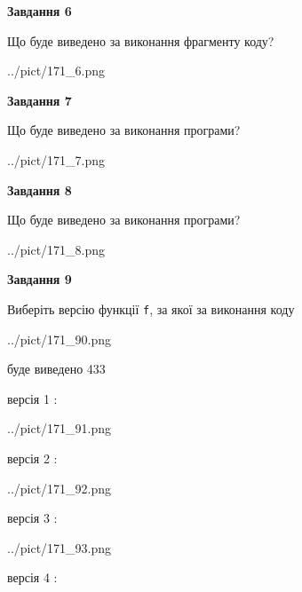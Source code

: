 \documentclass[12pt, ukrainian]{article}
\def\code#1{\Verb!#1!}
\begin{document}
{\begin {large}
{\begin {center}\textbf{Завдання 6}\end {center}}

Що буде виведено за виконання фрагменту коду?\par
\begin{center}
	{../pict/171_6.png}
\end{center}
\newpage

{\begin {center}\textbf{Завдання 7}\end {center}}

Що буде виведено за виконання програми?\par
\begin{center}
	{../pict/171_7.png}
\end{center}
\newpage

{\begin {center}\textbf{Завдання 8}\end {center}}

Що буде виведено за виконання програми?\par
\begin{center}
	{../pict/171_8.png}
\end{center}
\newpage

{\begin {center}\textbf{Завдання 9}\end {center}}

Виберіть версію функції \code{f}, за якої за виконання коду
\begin{center}
	{../pict/171_90.png}
\end{center}
буде виведено 433

\vspace{5mm}
версія 1 :

\begin{center}
	{../pict/171_91.png}
\end{center}
версія 2 :

\begin{center}
	{../pict/171_92.png}
\end{center}
версія 3 :

\begin{center}
	{../pict/171_93.png}
\end{center}
версія 4 :


\end{large}}
\end{document}
